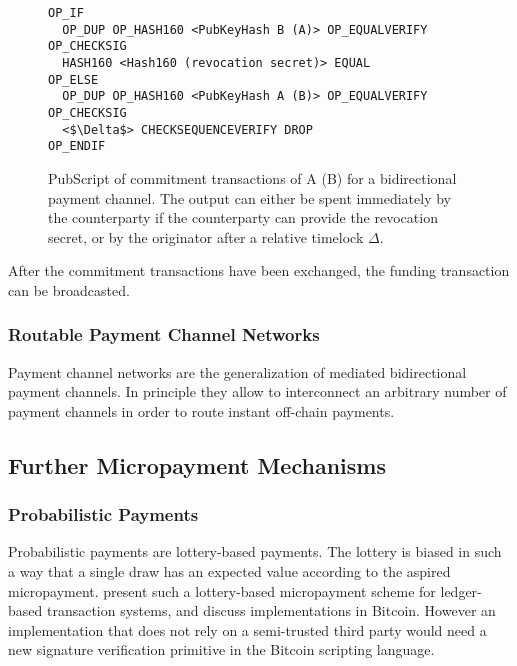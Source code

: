 \begin{figure}
\begin{lstlisting}[breaklines,mathescape=true]
OP_IF
  OP_DUP OP_HASH160 <PubKeyHash B (A)> OP_EQUALVERIFY OP_CHECKSIG
  HASH160 <Hash160 (revocation secret)> EQUAL
OP_ELSE
  OP_DUP OP_HASH160 <PubKeyHash A (B)> OP_EQUALVERIFY OP_CHECKSIG
  <$\Delta$> CHECKSEQUENCEVERIFY DROP
OP_ENDIF
\end{lstlisting} 
\caption{PubScript of commitment transactions of A (B) for a bidirectional payment channel. The output can either be spent immediately by the counterparty if the counterparty can provide the revocation secret, or by the originator after a relative timelock $\Delta$.}
\label{fig:pubScriptCommitment}
\end{figure}

After the commitment transactions have been exchanged, the funding transaction can be broadcasted. 

\subsubsection{Routable Payment Channel Networks}
\label{sec:paymentchannelnetworks}

Payment channel networks are the generalization of mediated bidirectional payment channels. In principle they allow to interconnect an arbitrary number of payment channels in order to route instant off-chain payments. 


\subsection{Further Micropayment Mechanisms}

\subsubsection{Probabilistic Payments}

Probabilistic payments \cite{wheeler1996transactions,rivest1996payword,rivest1997electronic} are lottery-based payments. The lottery is biased in such a way that a single draw has an expected value according to the aspired micropayment.
\cite{Pass:2015:MDC:2810103.2813713} present such a lottery-based micropayment scheme for ledger-based transaction systems, and discuss implementations in Bitcoin. However an implementation that does not rely on a semi-trusted third party would need a new signature verification primitive in the Bitcoin scripting language. 

